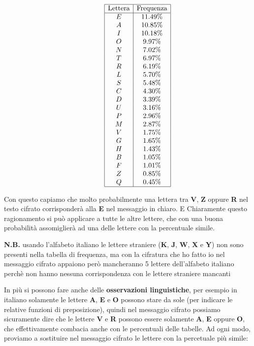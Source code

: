 \documentclass{report}
\begin{document}
\[\begin{array}{c@{\hskip 1cm}c}
\begin{array}{|c|c|}
\hline
\end{array}
&
\begin{array}{|c|c|}
\hline
\text{Lettera} & \text{Frequenza} \\ \hline
E & 11.49\%  \\ 
A & 10.85\%  \\ 
I & 10.18\%  \\ 
O & 9.97\%  \\ 
N & 7.02\%  \\ 
T & 6.97\%  \\ 
R & 6.19\%  \\ 
L & 5.70\%  \\ 
S & 5.48\%  \\ 
C & 4.30\%  \\ 
D & 3.39\%  \\ 
U & 3.16\%  \\ 
P & 2.96\%  \\ 
M & 2.87\%  \\ 
V & 1.75\%  \\ 
G & 1.65\%  \\ 
H & 1.43\%  \\ 
B & 1.05\%  \\ 
F & 1.01\%  \\ 
Z & 0.85\%  \\ 
Q & 0.45\%  \\  
\hline
\end{array}
\end{array}
\]


Con questo capiamo che molto probabilmente una lettera tra \textbf{V}, \textbf{Z} oppure \textbf{R} nel testo cifrato corrisponderà alla \textbf{E} nel messaggio in chiaro. E Chiaramente questo ragionamento si può applicare a tutte le altre lettere, che con una buona probabilità assomiglierà ad una delle lettere con la percentuale simile.

\textbf{N.B.} usando l'alfabeto italiano le lettere straniere (\textbf{K}, \textbf{J}, \textbf{W}, \textbf{X} e \textbf{Y}) non sono presenti nella tabella di frequenza, ma con la cifratura che ho fatto io nel messaggio cifrato appaiono però mancheranno 5 lettere dell'alfabeto italiano perchè non hanno nessuna corrispondenza con le lettere straniere mancanti 

\newpage
In più si possono fare anche delle \textbf{osservazioni linguistiche}, per esempio in italiano solamente le lettere \textbf{A}, \textbf{E} e \textbf{O} possono stare da sole (per indicare le relative funzioni di preposizione), quindi nel messaggio cifrato possiamo sicuramente dire che le lettere \textbf{V} e \textbf{R} possono essere solamente \textbf{A}, \textbf{E} oppure \textbf{O}, che effettivamente combacia anche con le percentuali delle tabelle.
Ad ogni modo, proviamo a sostituire nel messaggio cifrato le lettere con la percetuale più simile:
\end{document}
